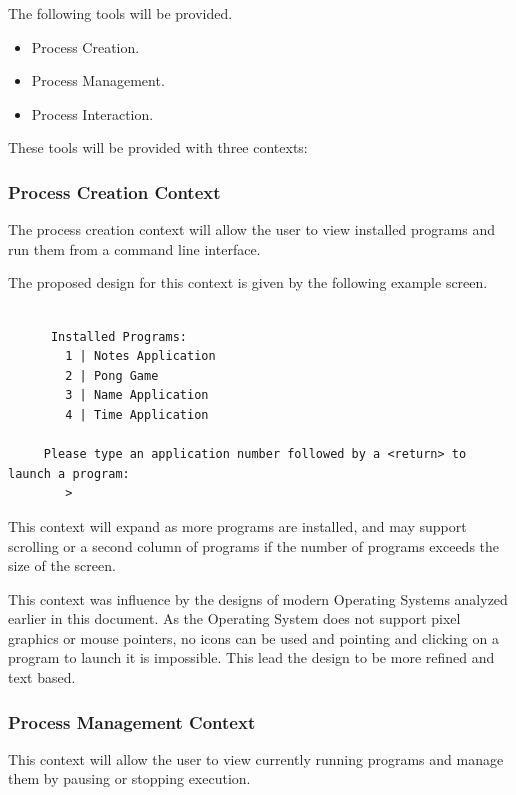 \documentclass[a4paper]{report}
\begin{document}
The following tools will be provided.
\begin{itemize}
\item Process Creation.
\item Process Management.
\item Process Interaction.
\end{itemize}

These tools will be provided with three contexts:

\subsubsection*{Process Creation Context}

The process creation context will allow the user to view installed programs and run them from a command line interface.

The proposed design for this context is given by the following example screen.
{\ttfamily \small
  \begin{framed}
    \begin{verbatim}

      Installed Programs:
        1 | Notes Application
        2 | Pong Game
        3 | Name Application
        4 | Time Application

     Please type an application number followed by a <return> to launch a program:
        > 

    \end{verbatim}
  \end{framed}
}


This context will expand as more programs are installed, and may support scrolling or a second column of programs if the number of programs exceeds the size of the screen.

This context was influence by the designs of modern Operating Systems analyzed earlier in this document. As the Operating System does not support pixel graphics or mouse pointers, no icons can be used and pointing and clicking on a program to launch it is impossible. This lead the design to be more refined and text based.


\subsubsection*{Process Management Context}

This context will allow the user to view currently running programs and manage them by pausing or stopping execution.
\end{document}
